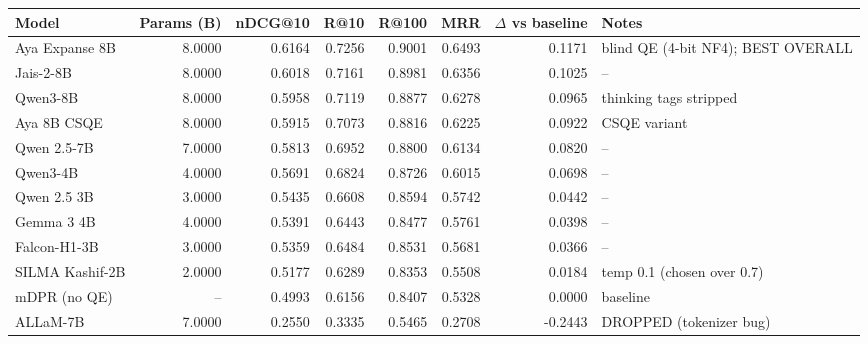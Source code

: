 \begin{tabular}{lrrrrrrl}
\toprule
Model & Params (B) & nDCG@10 & R@10 & R@100 & MRR & $\Delta$ vs baseline & Notes \\
\midrule
Aya Expanse 8B & 8.0000 & 0.6164 & 0.7256 & 0.9001 & 0.6493 & 0.1171 & blind QE (4-bit NF4); BEST OVERALL \\
Jais-2-8B & 8.0000 & 0.6018 & 0.7161 & 0.8981 & 0.6356 & 0.1025 & -- \\
Qwen3-8B & 8.0000 & 0.5958 & 0.7119 & 0.8877 & 0.6278 & 0.0965 & thinking tags stripped \\
Aya 8B CSQE & 8.0000 & 0.5915 & 0.7073 & 0.8816 & 0.6225 & 0.0922 & CSQE variant \\
Qwen 2.5-7B & 7.0000 & 0.5813 & 0.6952 & 0.8800 & 0.6134 & 0.0820 & -- \\
Qwen3-4B & 4.0000 & 0.5691 & 0.6824 & 0.8726 & 0.6015 & 0.0698 & -- \\
Qwen 2.5 3B & 3.0000 & 0.5435 & 0.6608 & 0.8594 & 0.5742 & 0.0442 & -- \\
Gemma 3 4B & 4.0000 & 0.5391 & 0.6443 & 0.8477 & 0.5761 & 0.0398 & -- \\
Falcon-H1-3B & 3.0000 & 0.5359 & 0.6484 & 0.8531 & 0.5681 & 0.0366 & -- \\
SILMA Kashif-2B & 2.0000 & 0.5177 & 0.6289 & 0.8353 & 0.5508 & 0.0184 & temp 0.1 (chosen over 0.7) \\
mDPR (no QE) & -- & 0.4993 & 0.6156 & 0.8407 & 0.5328 & 0.0000 & baseline \\
ALLaM-7B & 7.0000 & 0.2550 & 0.3335 & 0.5465 & 0.2708 & -0.2443 & DROPPED (tokenizer bug) \\
\bottomrule
\end{tabular}
